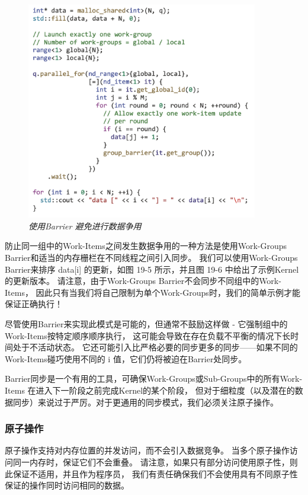 \begin{figure}[H]
	\centering
	\includegraphics[width=0.9\textwidth]{figs/F19.6.png}
	\caption{\textit{使用Barrier 避免进行数据争用 }}
\end{figure}

防止同一组中的Work-Items之间发生数据争用的一种方法是使用Work-Groups Barrier和适当的内存栅栏在不同线程之间引入同步。 
我们可以使用Work-Groups Barrier来排序 data[i] 的更新，如图 19-5 所示，并且图 19-6 中给出了示例Kernel的更新版本。 
请注意，由于Work-Groups Barrier不会同步不同组中的Work-Items，
因此只有当我们将自己限制为单个Work-Groups时，我们的简单示例才能保证正确执行！

尽管使用Barrier来实现此模式是可能的，但通常不鼓励这样做 - 它强制组中的Work-Items按特定顺序顺序执行，
这可能会导致在存在负载不平衡的情况下长时间处于不活动状态。 
它还可能引入比严格必要的同步更多的同步——如果不同的Work-Items碰巧使用不同的 i 值，它们仍将被迫在Barrier处同步。

Barrier同步是一个有用的工具，可确保Work-Groups或Sub-Groups中的所有Work-Items
在进入下一阶段之前完成Kernel的某个阶段，
但对于细粒度（以及潜在的数据同步）来说过于严厉。对于更通用的同步模式，我们必须关注原子操作。

\subsubsection{原子操作}
原子操作支持对内存位置的并发访问，而不会引入数据竞争。 当多个原子操作访问同一内存时，保证它们不会重叠。 
请注意，如果只有部分访问使用原子性，则此保证不适用，并且作为程序员，
我们有责任确保我们不会使用具有不同原子性保证的操作同时访问相同的数据。

